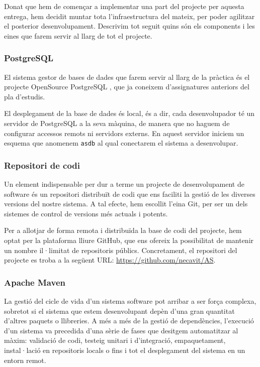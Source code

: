 Donat que hem de començar a implementar una part del projecte per aquesta entrega, hem decidit muntar tota l'infraestructura del mateix, per poder agilitzar el posterior desenvolupament. Descrivim tot seguit quins són els components i les eines que farem servir al llarg de tot el projecte.

\subsubsection{PostgreSQL}
El sistema gestor de bases de dades que farem servir al llarg de la pràctica és el projecte OpenSource PostgreSQL \cite{website:PostgreSQL}, que ja coneixem d'assignatures anteriors del pla d'estudis.

El desplegament de la base de dades és local, és a dir, cada desenvolupador té un servidor de PostgreSQL a la seva màquina, de manera que no haguem de configurar accessos remots ni servidors externs. En aquest servidor iniciem un esquema que anomenem \texttt{asdb} al qual conectarem el sistema a desenvolupar.

\subsubsection{Repositori de codi}
Un element indispensable per dur a terme un projecte de desenvolupament de software és un repositori distribuït de codi que ens faciliti la gestió de les diverses versions del nostre sistema. A tal efecte, hem escollit l'eina Git, per ser un dels sistemes de control de versions més actuals i potents.

Per a allotjar de forma remota i distribuïda la base de codi del projecte, hem optat per la plataforma lliure GitHub, que ens ofereix la possibilitat de mantenir un nombre il·limitat de repositoris públics. Concretament, el repositori del projecte es troba a la següent URL: \url{https://github.com/necavit/AS}.

\subsubsection{Apache Maven}
La gestió del cicle de vida d'un sistema software pot arribar a ser força complexa, sobretot si el sistema que estem desenvolupant depèn d'una gran quantitat d'altres paquets o llibreries. A més a més de la gestió de dependències, l'execució d'un sistema va precedida d'una sèrie de fases que desitgem automatitzar al màxim: validació de codi, testeig unitari i d'integració, empaquetament, instal·lació en repositoris locals o fins i tot el desplegament del sistema en un entorn remot.

